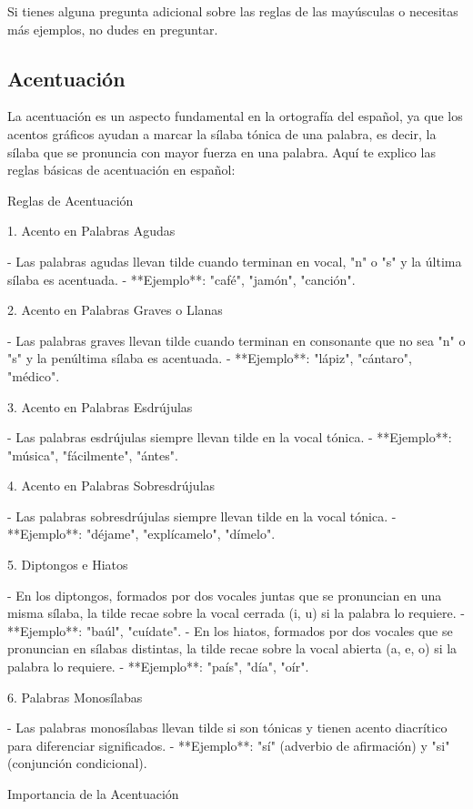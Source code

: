 Si tienes alguna pregunta adicional sobre las reglas de las mayúsculas o necesitas más ejemplos, no dudes en preguntar.

\subsection{Acentuación}

La acentuación es un aspecto fundamental en la ortografía del español, ya que los acentos gráficos ayudan a marcar la sílaba tónica de una palabra, es decir, la sílaba que se pronuncia con mayor fuerza en una palabra. Aquí te explico las reglas básicas de acentuación en español:

Reglas de Acentuación

1. Acento en Palabras Agudas

- Las palabras agudas llevan tilde cuando terminan en vocal, "n" o "s" y la última sílaba es acentuada.
- **Ejemplo**: "café", "jamón", "canción".

2. Acento en Palabras Graves o Llanas

- Las palabras graves llevan tilde cuando terminan en consonante que no sea "n" o "s" y la penúltima sílaba es acentuada.
- **Ejemplo**: "lápiz", "cántaro", "médico".

3. Acento en Palabras Esdrújulas

- Las palabras esdrújulas siempre llevan tilde en la vocal tónica.
- **Ejemplo**: "música", "fácilmente", "ántes".

4. Acento en Palabras Sobresdrújulas

- Las palabras sobresdrújulas siempre llevan tilde en la vocal tónica.
- **Ejemplo**: "déjame", "explícamelo", "dímelo".

5. Diptongos e Hiatos

- En los diptongos, formados por dos vocales juntas que se pronuncian en una misma sílaba, la tilde recae sobre la vocal cerrada (i, u) si la palabra lo requiere.
- **Ejemplo**: "baúl", "cuídate".
- En los hiatos, formados por dos vocales que se pronuncian en sílabas distintas, la tilde recae sobre la vocal abierta (a, e, o) si la palabra lo requiere.
- **Ejemplo**: "país", "día", "oír".

6. Palabras Monosílabas

- Las palabras monosílabas llevan tilde si son tónicas y tienen acento diacrítico para diferenciar significados.
- **Ejemplo**: "sí" (adverbio de afirmación) y "si" (conjunción condicional).

Importancia de la Acentuación


